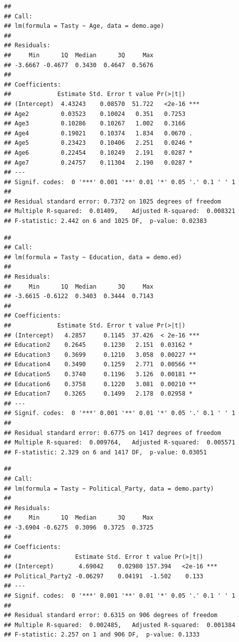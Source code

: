 \documentclass[
  12pt,
]{article}
\begin{document}
\begin{verbatim}
## 
## Call:
## lm(formula = Tasty ~ Age, data = demo.age)
## 
## Residuals:
##     Min      1Q  Median      3Q     Max 
## -3.6667 -0.4677  0.3430  0.4647  0.5676 
## 
## Coefficients:
##             Estimate Std. Error t value Pr(>|t|)    
## (Intercept)  4.43243    0.08570  51.722   <2e-16 ***
## Age2         0.03523    0.10024   0.351   0.7253    
## Age3         0.10286    0.10267   1.002   0.3166    
## Age4         0.19021    0.10374   1.834   0.0670 .  
## Age5         0.23423    0.10406   2.251   0.0246 *  
## Age6         0.22454    0.10249   2.191   0.0287 *  
## Age7         0.24757    0.11304   2.190   0.0287 *  
## ---
## Signif. codes:  0 '***' 0.001 '**' 0.01 '*' 0.05 '.' 0.1 ' ' 1
## 
## Residual standard error: 0.7372 on 1025 degrees of freedom
## Multiple R-squared:  0.01409,    Adjusted R-squared:  0.008321 
## F-statistic: 2.442 on 6 and 1025 DF,  p-value: 0.02383
\end{verbatim}

\begin{verbatim}
## 
## Call:
## lm(formula = Tasty ~ Education, data = demo.ed)
## 
## Residuals:
##     Min      1Q  Median      3Q     Max 
## -3.6615 -0.6122  0.3403  0.3444  0.7143 
## 
## Coefficients:
##             Estimate Std. Error t value Pr(>|t|)    
## (Intercept)   4.2857     0.1145  37.426  < 2e-16 ***
## Education2    0.2645     0.1230   2.151  0.03162 *  
## Education3    0.3699     0.1210   3.058  0.00227 ** 
## Education4    0.3490     0.1259   2.771  0.00566 ** 
## Education5    0.3740     0.1196   3.126  0.00181 ** 
## Education6    0.3758     0.1220   3.081  0.00210 ** 
## Education7    0.3265     0.1499   2.178  0.02958 *  
## ---
## Signif. codes:  0 '***' 0.001 '**' 0.01 '*' 0.05 '.' 0.1 ' ' 1
## 
## Residual standard error: 0.6775 on 1417 degrees of freedom
## Multiple R-squared:  0.009764,   Adjusted R-squared:  0.005571 
## F-statistic: 2.329 on 6 and 1417 DF,  p-value: 0.03051
\end{verbatim}

\begin{verbatim}
## 
## Call:
## lm(formula = Tasty ~ Political_Party, data = demo.party)
## 
## Residuals:
##     Min      1Q  Median      3Q     Max 
## -3.6904 -0.6275  0.3096  0.3725  0.3725 
## 
## Coefficients:
##                  Estimate Std. Error t value Pr(>|t|)    
## (Intercept)       4.69042    0.02980 157.394   <2e-16 ***
## Political_Party2 -0.06297    0.04191  -1.502    0.133    
## ---
## Signif. codes:  0 '***' 0.001 '**' 0.01 '*' 0.05 '.' 0.1 ' ' 1
## 
## Residual standard error: 0.6315 on 906 degrees of freedom
## Multiple R-squared:  0.002485,   Adjusted R-squared:  0.001384 
## F-statistic: 2.257 on 1 and 906 DF,  p-value: 0.1333
\end{verbatim}
\end{document}
